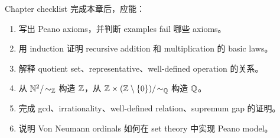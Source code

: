 \begin{reviewbox}{Chapter checklist}
完成本章后，应能：
\begin{enumerate}
  \item 写出 Peano axioms，并判断 examples fail 哪些 axioms。
  \item 用 induction 证明 recursive addition 和 multiplication 的 basic laws。
  \item 解释 quotient set、representative、well-defined operation 的关系。
  \item 从 \(\mathbb{N}^2/\!\sim_{\mathbb{Z}}\) 构造 \(\mathbb{Z}\)，从
  \(\mathbb{Z}\times(\mathbb{Z}\setminus\{0\})/\!\sim_{\mathbb{Q}}\) 构造 \(\mathbb{Q}\)。
  \item 完成 gcd、irrationality、well-defined relation、supremum gap 的证明。
  \item 说明 Von Neumann ordinals 如何在 set theory 中实现 Peano model。
\end{enumerate}
\end{reviewbox}
